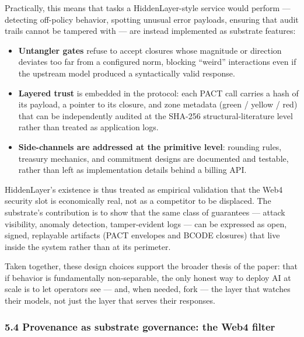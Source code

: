 Practically, this means that tasks a HiddenLayer-style service would
perform --- detecting off-policy behavior, spotting unusual error
payloads, ensuring that audit trails cannot be tampered with --- are
instead implemented as substrate features:

\begin{itemize}
\tightlist
\item
  \textbf{Untangler gates} refuse to accept closures whose magnitude or
  direction deviates too far from a configured norm, blocking ``weird''
  interactions even if the upstream model produced a syntactically valid
  response.
\item
  \textbf{Layered trust} is embedded in the protocol: each PACT call
  carries a hash of its payload, a pointer to its closure, and zone
  metadata (green / yellow / red) that can be independently audited at
  the SHA-256 structural-literature level rather than treated as
  application logs.
\item
  \textbf{Side-channels are addressed at the primitive level}: rounding
  rules, treasury mechanics, and commitment designs are documented and
  testable, rather than left as implementation details behind a billing
  API.
\end{itemize}

HiddenLayer's existence is thus treated as empirical validation that the
Web4 security slot is economically real, not as a competitor to be
displaced. The substrate's contribution is to show that the same class
of guarantees --- attack visibility, anomaly detection, tamper-evident
logs --- can be expressed as open, signed, replayable artifacts (PACT
envelopes and BCODE closures) that live inside the system rather than at
its perimeter.

Taken together, these design choices support the broader thesis of the
paper: that if behavior is fundamentally non-separable, the only honest
way to deploy AI at scale is to let operators see --- and, when needed,
fork --- the layer that watches their models, not just the layer that
serves their responses.

\subsubsection{5.4 Provenance as substrate governance: the Web4
filter}\label{provenance-as-substrate-governance-the-web4-filter}

